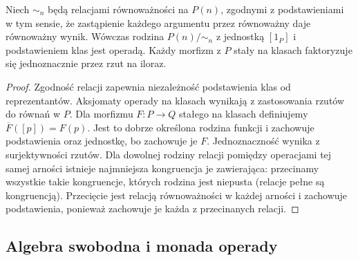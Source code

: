 \begin{stwierdzenie}\label{cat:prop:operad-quotient}
Niech $\sim_n$ będą relacjami równoważności na $P(n)$, zgodnymi z podstawieniami w tym sensie, że zastąpienie każdego argumentu przez równoważny daje równoważny wynik. Wówczas rodzina $P(n)/{\sim_n}$ z jednostką $[1_P]$ i podstawieniem klas jest operadą. Każdy morfizm z $P$ stały na klasach faktoryzuje się jednoznacznie przez rzut na iloraz.
\end{stwierdzenie}
\begin{proof}
Zgodność relacji zapewnia niezależność podstawienia klas od reprezentantów. Aksjomaty operady na klasach wynikają z zastosowania rzutów do równań w $P$. Dla morfizmu $F:P\to Q$ stałego na klasach definiujemy $\overline F([p])=F(p)$. Jest to dobrze określona rodzina funkcji i zachowuje podstawienia oraz jednostkę, bo zachowuje je $F$. Jednoznaczność wynika z surjektywności rzutów. Dla dowolnej rodziny relacji pomiędzy operacjami tej samej arności istnieje najmniejsza kongruencja je zawierająca: przecinamy wszystkie takie kongruencje, których rodzina jest niepusta (relacje pełne są kongruencją). Przecięcie jest relacją równoważności w każdej arności i zachowuje podstawienia, ponieważ zachowuje je każda z przecinanych relacji.
\end{proof}

\subsection{Algebra swobodna i monada operady}

